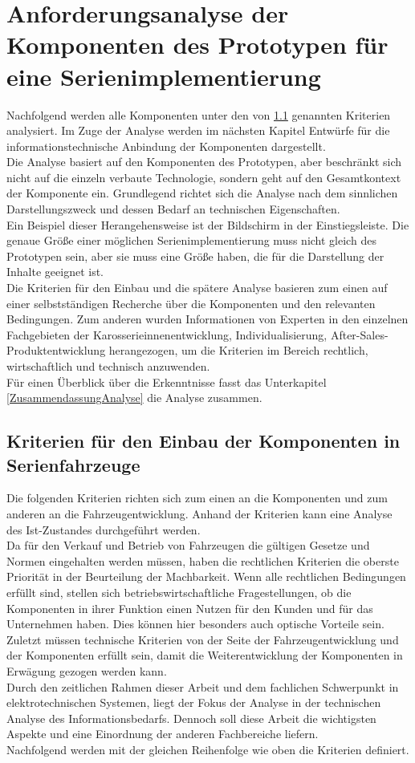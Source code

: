 \chapter{Anforderungsanalyse der Komponenten des Prototypen für eine Serienimplementierung}
\label{cha:Analyse}
Nachfolgend werden alle Komponenten unter den von \ref{cha:Kriterien} genannten Kriterien analysiert. Im Zuge der Analyse werden im nächsten Kapitel Entwürfe für die informationstechnische Anbindung der Komponenten dargestellt.\\
Die Analyse basiert auf den Komponenten des Prototypen, aber beschränkt sich nicht auf die einzeln verbaute Technologie, sondern geht auf den Gesamtkontext der Komponente ein. Grundlegend richtet sich die Analyse nach dem sinnlichen Darstellungszweck und dessen Bedarf an technischen Eigenschaften. \\
Ein Beispiel dieser Herangehensweise ist der Bildschirm in der Einstiegsleiste. Die genaue Größe einer möglichen Serienimplementierung muss nicht gleich des Prototypen sein, aber sie muss eine Größe haben, die für die Darstellung der Inhalte geeignet ist.\\
Die Kriterien für den Einbau und die spätere Analyse basieren zum einen auf einer selbstständigen Recherche über die Komponenten und den relevanten Bedingungen. Zum anderen wurden Informationen von Experten in den einzelnen Fachgebieten der Karosserieinnenentwicklung, Individualisierung, After-Sales-Produktentwicklung herangezogen, um die Kriterien im Bereich rechtlich, wirtschaftlich und technisch anzuwenden. \\
Für einen Überblick über die Erkenntnisse fasst das Unterkapitel \ref{ZusammendassungAnalyse} die Analyse zusammen.
\section{Kriterien für den Einbau der Komponenten in Serienfahrzeuge}
\label{cha:Kriterien}
Die folgenden Kriterien richten sich zum einen an die Komponenten und zum anderen an die Fahrzeugentwicklung. Anhand der Kriterien kann eine Analyse des Ist-Zustandes durchgeführt werden.\\
Da für den Verkauf und Betrieb von Fahrzeugen die gültigen Gesetze und Normen eingehalten werden müssen, haben die rechtlichen Kriterien die oberste Priorität in der Beurteilung der Machbarkeit. Wenn alle rechtlichen Bedingungen erfüllt sind, stellen sich betriebswirtschaftliche Fragestellungen, ob die Komponenten in ihrer Funktion einen Nutzen für den Kunden und für das Unternehmen haben. Dies können hier besonders auch optische Vorteile sein. Zuletzt müssen technische Kriterien von der Seite der Fahrzeugentwicklung und der Komponenten erfüllt sein, damit die Weiterentwicklung der Komponenten in Erwägung gezogen werden kann. \\
Durch den zeitlichen Rahmen dieser Arbeit und dem fachlichen Schwerpunkt in elektrotechnischen Systemen, liegt der Fokus der Analyse in der technischen Analyse des Informationsbedarfs. Dennoch soll diese Arbeit die wichtigsten Aspekte und eine Einordnung der anderen Fachbereiche liefern.\\
Nachfolgend werden mit der gleichen Reihenfolge wie oben die Kriterien definiert.
